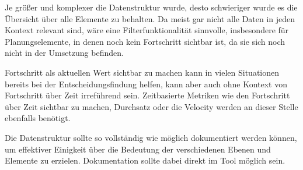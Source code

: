 Je größer und komplexer die Datenstruktur wurde, desto schwieriger wurde es die Übersicht über alle Elemente zu behalten. Da meist gar nicht alle Daten in jeden Kontext relevant sind, wäre eine Filterfunktionalität sinnvolle, insbesondere für Planungselemente, in denen noch kein Fortschritt sichtbar ist, da sie sich noch nicht in der Umsetzung befinden.

Fortschritt als aktuellen Wert sichtbar zu machen kann in vielen Situationen bereits bei der Entscheidungsfindung helfen, kann aber auch ohne Kontext von Fortschritt über Zeit irreführend sein. Zeitbasierte Metriken wie den Fortschritt über Zeit sichtbar zu machen, Durchsatz oder die Velocity werden an dieser Stelle ebenfalls benötigt.

Die Datenstruktur sollte so vollständig wie möglich dokumentiert werden können, um effektiver Einigkeit über die Bedeutung der verschiedenen Ebenen und Elemente zu erzielen. Dokumentation sollte dabei direkt im Tool möglich sein.